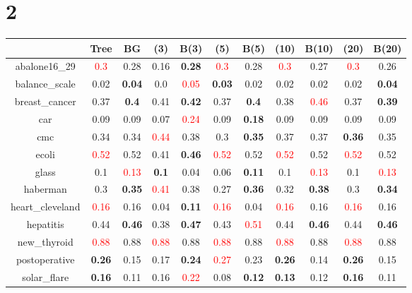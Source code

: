 \documentclass{article}%
\begin{document}
\section*{2}%
\begin{tabular}{c|cccccccccc}%
\hline%
&Tree&BG&(3)&B(3)&(5)&B(5)&(10)&B(10)&(20)&B(20)\\%
\hline%
abalone16\_29&\textcolor{red}{ 
0.3
}&0.28&0.16&\textbf{0.28}&\textcolor{red}{ 
0.3
}&0.28&\textcolor{red}{ 
0.3
}&0.27&\textcolor{red}{ 
0.3
}&0.26\\%
\hline%
balance\_scale&0.02&\textbf{0.04}&0.0&\textcolor{red}{ 
0.05
}&\textbf{0.03}&0.02&0.02&0.02&0.02&\textbf{0.04}\\%
\hline%
breast\_cancer&0.37&\textbf{0.4}&0.41&\textbf{0.42}&0.37&\textbf{0.4}&0.38&\textcolor{red}{ 
0.46
}&0.37&\textbf{0.39}\\%
\hline%
car&0.09&0.09&0.07&\textcolor{red}{ 
0.24
}&0.09&\textbf{0.18}&0.09&0.09&0.09&0.09\\%
\hline%
cmc&0.34&0.34&\textcolor{red}{ 
0.44
}&0.38&0.3&\textbf{0.35}&0.37&0.37&\textbf{0.36}&0.35\\%
\hline%
ecoli&\textcolor{red}{ 
0.52
}&0.52&0.41&\textbf{0.46}&\textcolor{red}{ 
0.52
}&0.52&\textcolor{red}{ 
0.52
}&0.52&\textcolor{red}{ 
0.52
}&0.52\\%
\hline%
glass&0.1&\textcolor{red}{ 
0.13
}&\textbf{0.1}&0.04&0.06&\textbf{0.11}&0.1&\textcolor{red}{ 
0.13
}&0.1&\textcolor{red}{ 
0.13
}\\%
\hline%
haberman&0.3&\textbf{0.35}&\textcolor{red}{ 
0.41
}&0.38&0.27&\textbf{0.36}&0.32&\textbf{0.38}&0.3&\textbf{0.34}\\%
\hline%
heart\_cleveland&\textcolor{red}{ 
0.16
}&0.16&0.04&\textbf{0.11}&\textcolor{red}{ 
0.16
}&0.04&\textcolor{red}{ 
0.16
}&0.16&\textcolor{red}{ 
0.16
}&0.16\\%
\hline%
hepatitis&0.44&\textbf{0.46}&0.38&\textbf{0.47}&0.43&\textcolor{red}{ 
0.51
}&0.44&\textbf{0.46}&0.44&\textbf{0.46}\\%
\hline%
new\_thyroid&\textcolor{red}{ 
0.88
}&0.88&\textcolor{red}{ 
0.88
}&0.88&\textcolor{red}{ 
0.88
}&0.88&\textcolor{red}{ 
0.88
}&0.88&\textcolor{red}{ 
0.88
}&0.88\\%
\hline%
postoperative&\textbf{0.26}&0.15&0.17&\textbf{0.24}&\textcolor{red}{ 
0.27
}&0.23&\textbf{0.26}&0.14&\textbf{0.26}&0.15\\%
\hline%
solar\_flare&\textbf{0.16}&0.11&0.16&\textcolor{red}{ 
0.22
}&0.08&\textbf{0.12}&\textbf{0.13}&0.12&\textbf{0.16}&0.11\\%

\end{tabular}
\end{document}
